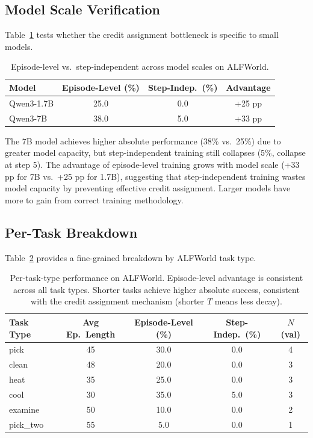 \documentclass[11pt]{article}
\begin{document}
\subsection{Model Scale Verification}

Table~\ref{tab:scale} tests whether the credit assignment bottleneck is specific to small models.

\begin{table}[h]
\centering
\caption{Episode-level vs.\ step-independent across model scales on ALFWorld.}
\label{tab:scale}
\begin{tabular}{@{}lccc@{}}
\toprule
Model & Episode-Level (\%) & Step-Indep.\ (\%) & Advantage \\
\midrule
Qwen3-1.7B & 25.0 & 0.0 & +25 pp \\
Qwen3-7B & 38.0 & 5.0 & +33 pp \\
\bottomrule
\end{tabular}
\end{table}

The 7B model achieves higher absolute performance (38\% vs.\ 25\%) due to greater model capacity, but step-independent training still collapses (5\%, collapse at step 5). The advantage of episode-level training grows with model scale (+33 pp for 7B vs.\ +25 pp for 1.7B), suggesting that step-independent training wastes model capacity by preventing effective credit assignment. Larger models have more to gain from correct training methodology.

\subsection{Per-Task Breakdown}

Table~\ref{tab:pertask} provides a fine-grained breakdown by ALFWorld task type.

\begin{table}[h]
\centering
\caption{Per-task-type performance on ALFWorld. Episode-level advantage is consistent across all task types. Shorter tasks achieve higher absolute success, consistent with the credit assignment mechanism (shorter $T$ means less decay).}
\label{tab:pertask}
\begin{tabular}{@{}lcccc@{}}
\toprule
Task Type & Avg Ep.\ Length & Episode-Level (\%) & Step-Indep.\ (\%) & $N$ (val) \\
\midrule
pick & 45 & 30.0 & 0.0 & 4 \\
clean & 48 & 20.0 & 0.0 & 3 \\
heat & 35 & 25.0 & 0.0 & 3 \\
cool & 30 & 35.0 & 5.0 & 3 \\
examine & 50 & 10.0 & 0.0 & 2 \\
pick\_two & 55 & 5.0 & 0.0 & 1 \\
\bottomrule
\end{tabular}
\end{table}
\end{document}
